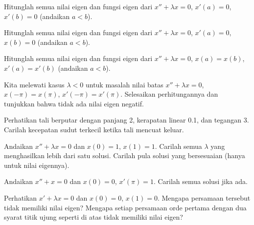 \begin{exercise}
Hitunglah semua
nilai eigen dan fungsi eigen dari
$x'' + \lambda x = 0$, $x'(a) = 0$, $x'(b) = 0$ (andaikan $a < b$).
\end{exercise}

\begin{exercise}
Hitunglah semua
nilai eigen dan fungsi eigen dari
$x'' + \lambda x = 0$, $x'(a) = 0$, $x(b) = 0$ (andaikan $a < b$).
\end{exercise}

\begin{exercise}
Hitunglah semua
nilai eigen dan fungsi eigen dari
$x'' + \lambda x = 0$, $x(a) = x(b)$, $x'(a) = x'(b)$ (andaikan $a < b$).
\end{exercise}

\begin{exercise}
Kita melewati kasus $\lambda < 0$ untuk
masalah nilai batas
$x'' + \lambda x = 0$, $x(-\pi) = x(\pi)$, $x'(-\pi) = x'(\pi)$.
Selesaikan perhitungannya dan tunjukkan bahwa tidak ada nilai eigen negatif.
\end{exercise}

\setcounter{exercise}{100}

\begin{exercise}
Perhatikan tali berputar dengan panjang 2, kerapatan linear 0.1, dan tegangan 3.
Carilah kecepatan sudut terkecil ketika tali mencuat keluar.
\end{exercise}

\begin{exercise}
Andaikan $x'' + \lambda x = 0$ dan $x(0)=1$, $x(1) = 1$.
Carilah semua $\lambda$ yang menghasilkan lebih dari
satu solusi.  Carilah pula solusi yang bersesuaian (hanya untuk
nilai eigennya).
\end{exercise}

\begin{exercise}
Andaikan $x'' + x = 0$ dan $x(0)=0$, $x'(\pi) = 1$.
Carilah semua solusi jika ada.
\end{exercise}

\begin{exercise}
Perhatikan
$x' + \lambda x = 0$ dan $x(0)=0$, $x(1) = 0$.  Mengapa persamaan tersebut tidak
memiliki nilai eigen?  Mengapa setiap persamaan orde pertama dengan dua syarat titik
ujung seperti di atas tidak memiliki nilai eigen?
\end{exercise}

